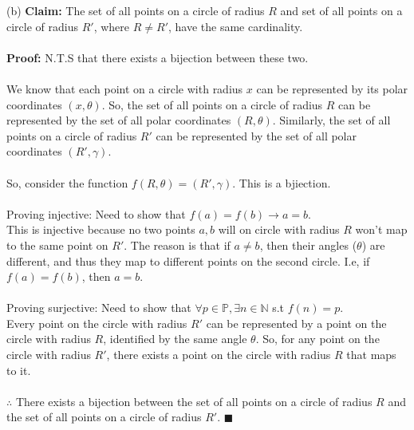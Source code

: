 \documentclass[a4paper]{article}
\begin{document}
\begin{enumerate}
    (b) \textbf{Claim:} The set of all points on a circle of radius $R$ and set of all points on a circle of radius $R'$, where $R \neq R'$, have the same cardinality. \\
    \\
    \textbf{Proof:} N.T.S that there exists a bijection between these two. \\
    \\
    We know that each point on a circle with radius $x$ can be represented by its polar coordinates $(x, \theta)$. So, the set of all points on a circle of radius $R$ can be represented by the set of all polar coordinates $(R, \theta)$. Similarly, the set of all points on a circle of radius $R'$ can be represented by the set of all polar coordinates $(R', \gamma)$.\\
    \\
    So, consider the function $f(R, \theta) = (R', \gamma)$. This is a bjiection.\\
    \\
    Proving injective: Need to show that $f(a) = f(b) \rightarrow a = b$.\\
    This is injective because no two points $a, b$ will on circle with radius $R$ won't map to the same point on $R'$. The reason is that if $a \neq b$, then their angles ($\theta$) are different, and thus they map to different points on the second circle. I.e, if $f(a) = f(b)$, then $a = b$.\\
    \\
    Proving surjective: Need to show that $\forall p \in \mathbb{P}, \exists n \in \mathbb{N}$ s.t $f(n) = p$.\\
    Every point on the circle with radius $R'$ can be represented by a point on the circle with radius $R$, identified by the same angle $\theta$. So, for any point on the circle with radius $R'$, there exists a point on the circle with radius $R$ that maps to it.\\
    \\
    $\therefore$ There exists a bijection between the set of all points on a circle of radius $R$ and the set of all points on a circle of radius $R'$. $\blacksquare$\\



\end{enumerate}
\end{document}
